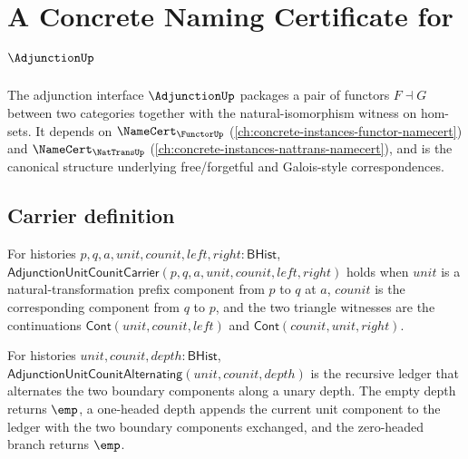 \chapter{A Concrete Naming Certificate for $\AdjunctionUp$}
\label{ch:concrete-instances-adjunction-namecert}

The adjunction interface $\AdjunctionUp$ packages a pair of functors $F \dashv G$ between two categories together with the natural-isomorphism witness on hom-sets. It depends on $\NameCert_{\FunctorUp}$ (\autoref{ch:concrete-instances-functor-namecert}) and $\NameCert_{\NatTransUp}$ (\autoref{ch:concrete-instances-nattrans-namecert}), and is the canonical structure underlying free/forgetful and Galois-style correspondences.

\section{Carrier definition}
\label{sec:adjunction-carrier}

\begin{definition}
\label{def:adjunction-unit-counit-carrier}
For histories $p,q,a,unit,counit,left,right:\mathsf{BHist}$,
$\mathsf{AdjunctionUnitCounitCarrier}(p,q,a,unit,counit,left,right)$ holds
when $unit$ is a natural-transformation prefix component from $p$ to $q$ at
$a$, $counit$ is the corresponding component from $q$ to $p$, and the two
triangle witnesses are the continuations $\mathsf{Cont}(unit,counit,left)$ and
$\mathsf{Cont}(counit,unit,right)$.
\end{definition}

\begin{definition}
\label{def:adjunction-unit-counit-alternating-ledger}
For histories $unit,counit,depth:\mathsf{BHist}$,
$\mathsf{AdjunctionUnitCounitAlternating}(unit,counit,depth)$ is the recursive
ledger that alternates the two boundary components along a unary depth. The
empty depth returns $\emp$, a one-headed depth appends the current unit
component to the ledger with the two boundary components exchanged, and the
zero-headed branch returns $\emp$.
\end{definition}

